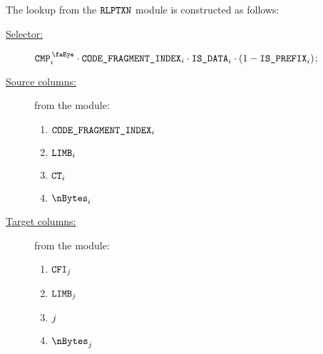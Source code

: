 The lookup from the $\texttt{RLPTXN}$ module is constructed as follows:
\begin{description}
	\item[\underline{Selector:}] $\isCmp_{i} \cdot \CFI{}_{i} \cdot \phaseData_{i} \cdot (1 - \isPrefix_{i})$;
	\item[\underline{Source columns:}] from the \rlpTxnMod{} module:
	\begin{multicols}{3}
	\begin{enumerate}
		\item $\texttt{CODE\_FRAGMENT\_INDEX}{}_{i}$
		\item $\texttt{LIMB}_{i}$
		\item $\texttt{CT}_{i}$
		\item $\nBytes_{i}$
	\end{enumerate}
	\end{multicols}
\item[\underline{Target columns:}] from the \romMod{} module: 
	\begin{multicols}{3}
	\begin{enumerate}
		\item $\texttt{CFI}_{j}$
		\item $\texttt{LIMB}_{j}$
		\item $\index_{j}$
		\item $\nBytes_{j}$
	\end{enumerate} 
	\end{multicols}
\end{description}
